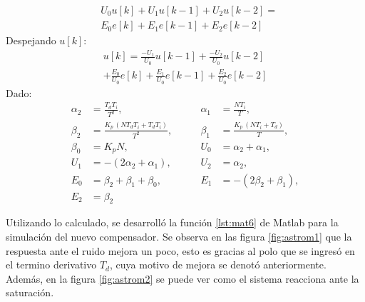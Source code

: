 \begin{equation}
	\begin{aligned}
			&U_0u[k]+U_1u[k-1]+U_2u[k-2] =\\
			&E_0e[k]+E_1e[k-1]+E_2e[k-2]
	\end{aligned}
\end{equation}
Despejando \(u[k]\):
\begin{equation}
	\begin{aligned}
	u[k]=\frac{-U_1}{U_0}u[k-1]+\frac{-U_2}{U_0}u[k-2]\\
	+\frac{E_0}{U_0}e[k]+\frac{E_1}{U_0}e[k-1]+\frac{E_2}{U_0}e[k-2]
	\end{aligned}
\end{equation}
Dado:
\[
	\begin{aligned}
		\alpha_2 &= \frac{T_d T_i}{T^2}, 
		&\qquad \alpha_1 &= \frac{N T_i}{T}, \\[6pt]
		\beta_2  &= \frac{K_p\,(N T_d T_i + T_d T_i)}{T^2}, 
		&\qquad \beta_1 &= \frac{K_p\,(N T_i + T_d)}{T}, \\[6pt]
		\beta_0  &= K_p N, 
		&\qquad U_0 &= \alpha_2 + \alpha_1, \\[6pt]
		U_1 &= -(2\alpha_2 + \alpha_1), 
		&\qquad U_2 &= \alpha_2, \\[6pt]
		E_0 &= \beta_2 + \beta_1 + \beta_0, 
		&\qquad E_1 &= -(2\beta_2 + \beta_1), \\[6pt]
		E_2 &= \beta_2
	\end{aligned}
\]

Utilizando lo calculado, se desarrolló la función \ref{lst:mat6} de Matlab para la simulación del nuevo compensador.
Se observa en las figura \ref{fig:astrom1} que la respuesta ante el ruido mejora un poco, esto es gracias al polo que se ingresó en el termino derivativo $T_d$, cuya motivo de mejora se denotó anteriormente. Además, en la figura \ref{fig:astrom2} se puede ver como el sistema reacciona ante la saturación.


